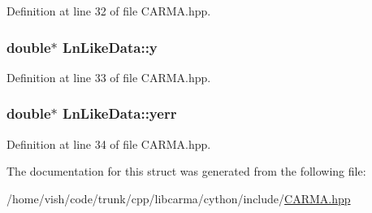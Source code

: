 Definition at line 32 of file C\-A\-R\-M\-A.\-hpp.

\hypertarget{struct_ln_like_data_ac75cc1e68fffac23d841e09f927a0a53}{
\subsubsection[{y}]{\setlength{\rightskip}{0pt plus 5cm}double$\ast$ Ln\-Like\-Data\-::y}}\label{struct_ln_like_data_ac75cc1e68fffac23d841e09f927a0a53}


Definition at line 33 of file C\-A\-R\-M\-A.\-hpp.

\hypertarget{struct_ln_like_data_a54330ef049f623a902d04f58e5aee208}{
\subsubsection[{yerr}]{\setlength{\rightskip}{0pt plus 5cm}double$\ast$ Ln\-Like\-Data\-::yerr}}\label{struct_ln_like_data_a54330ef049f623a902d04f58e5aee208}


Definition at line 34 of file C\-A\-R\-M\-A.\-hpp.



The documentation for this struct was generated from the following file\-:\begin{DoxyCompactItemize}
\item 
/home/vish/code/trunk/cpp/libcarma/cython/include/\hyperlink{_c_a_r_m_a_8hpp}{C\-A\-R\-M\-A.\-hpp}\end{DoxyCompactItemize}
